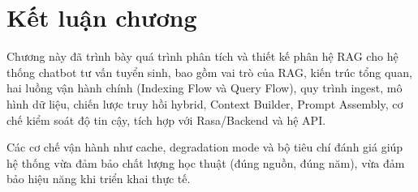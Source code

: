 ﻿\section{Kết luận chương}

Chương này đã trình bày quá trình phân tích và thiết kế phân hệ RAG cho hệ thống chatbot tư vấn tuyển sinh, bao gồm vai trò của RAG, kiến trúc tổng quan, hai luồng vận hành chính (Indexing Flow và Query Flow), quy trình ingest, mô hình dữ liệu, chiến lược truy hồi hybrid, Context Builder, Prompt Assembly, cơ chế kiểm soát độ tin cậy, tích hợp với Rasa/Backend và hệ API.

Các cơ chế vận hành như cache, degradation mode và bộ tiêu chí đánh giá giúp hệ thống vừa đảm bảo chất lượng học thuật (đúng nguồn, đúng năm), vừa đảm bảo hiệu năng khi triển khai thực tế.
